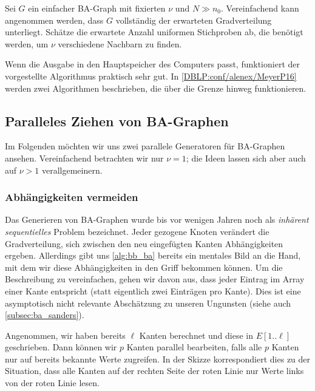 \begin{exercise}
    Sei $G$ ein einfacher BA-Graph mit fixierten $\nu$ und $N \gg n_0$.
    Vereinfachend kann angenommen werden, dass $G$ vollständig der erwarteten Gradverteilung unterliegt.
    Schätze die erwartete Anzahl uniformen Stichproben ab, die benötigt werden, um $\nu$ verschiedene Nachbarn zu finden.
\end{exercise}

Wenn die Ausgabe in den Hauptspeicher des Computers passt, funktioniert der vorgestellte Algorithmus praktisch sehr gut.
In \cref{DBLP:conf/alenex/MeyerP16} werden zwei Algorithmen beschrieben, die über die Grenze hinweg funktionieren.

\subsection{Paralleles Ziehen von BA-Graphen}
Im Folgenden möchten wir uns zwei parallele Generatoren für BA-Graphen ansehen.
Vereinfachend betrachten wir nur $\nu = 1$; die Ideen lassen sich aber auch auf $\nu > 1$ verallgemeinern.

\subsubsection{Abhängigkeiten vermeiden}
Das Generieren von BA-Graphen wurde bis vor wenigen Jahren noch als \emph{inhärent sequentielles} Problem bezeichnet.
Jeder gezogene Knoten verändert die Gradverteilung, \sd sich zwischen den neu eingefügten Kanten Abhängigkeiten ergeben.
Allerdings gibt uns \cref{alg:bb_ba} bereits ein mentales Bild an die Hand, mit dem wir diese Abhängigkeiten in den Griff bekommen können.
Um die Beschreibung zu vereinfachen, gehen wir davon aus, dass jeder Eintrag im Array einer Kante entspricht (statt eigentlich zwei Einträgen pro Kante).
Dies ist eine asymptotisch nicht relevante Abschätzung zu unseren Ungunsten (siehe auch \cref{subsec:ba_sanders}).

Angenommen, wir haben bereits $\ell$ Kanten berechnet und diese in $E[1..\ell]$ geschrieben.
Dann können wir $p$ Kanten parallel bearbeiten, falls alle $p$ Kanten nur auf bereits bekannte Werte zugreifen.
In der Skizze korrespondiert dies zu der Situation, dass alle Kanten auf der rechten Seite der roten Linie nur Werte links von der roten Linie lesen.

